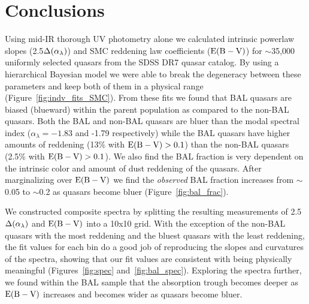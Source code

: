 
\section{Conclusions} \label{sec:conclusions}

Using mid-IR thorough UV photometry alone we calculated intrinsic powerlaw slopes (2.5$\Delta(\alpha_{\lambda})$) and SMC reddening law coefficients (${\rm E(B-V)}$) for $\sim$35,000 uniformly selected quasars from the SDSS DR7 quasar catalog.  By using a hierarchical Bayesian model we were able to break the degeneracy between these parameters and keep both of them in a physical range (Figure~\ref{fig:indv_fits_SMC}). From these fits we found that BAL quasars are biased (blueward) within the parent population as compared to the non-BAL quasars.
Both the BAL and non-BAL quasars are bluer than the modal spectral index ($\alpha_\lambda = -1.83$ and -1.79 respectively) while the BAL quasars have higher amounts of reddening (13\% with ${\rm E(B-V)}>0.1$) than the non-BAL quasars (2.5\% with ${\rm E(B-V)}>0.1$).
We also find the BAL fraction is very dependent on the intrinsic color and amount of dust reddening of the quasars.  After marginalizing over ${\rm E(B-V)}$ we find the {\em observed} BAL fraction increases from $\sim$0.05 to $\sim$0.2 as quasars become bluer (Figure~\ref{fig:bal_frac}). 

We constructed composite spectra by splitting the resulting measurements of 2.5$\Delta(\alpha_{\lambda})$ and ${\rm E(B-V)}$ into a 10x10 grid. With the exception of the non-BAL quasars with the most reddening and the bluest quasars with the least reddening, the fit values for each bin do a good job of reproducing the slopes and curvatures of the spectra, showing that our fit values are consistent with being physically meaningful (Figures~\ref{fig:spec} and~\ref{fig:bal_spec}). Exploring the spectra further, we found within the BAL sample that the  absorption trough becomes deeper as ${\rm E(B-V)}$ increases and becomes wider as quasars become bluer.

